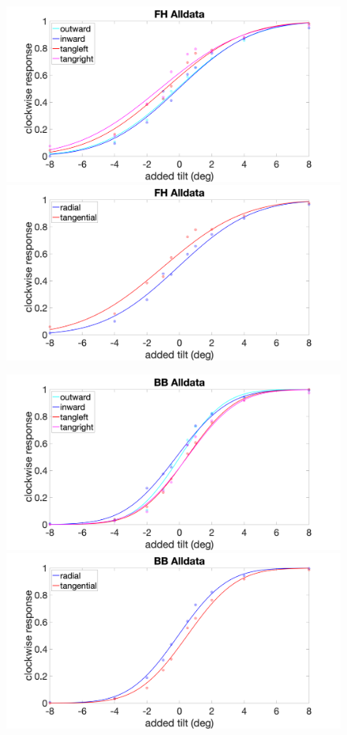 \documentclass[11pt]{article} %
\begin{document}
\begin{figure}[H]
\centering %
\includegraphics[scale=.16]{Images/FH_PF_Alldata_4conds.png}
\includegraphics[scale=.16]{Images/FH_PF_Alldata_2conds.png}
\end{figure}
\begin{figure}[H]
\centering %
\includegraphics[scale=.16]{Images/BB_PF_Alldata_4conds.png}
\includegraphics[scale=.16]{Images/BB_PF_Alldata_2conds.png}
\end{figure}
\end{document}
